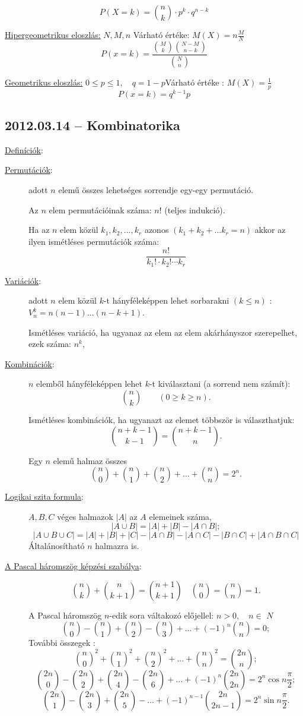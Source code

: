 \documentclass{article}
\begin{document}
$$P(X=k)=\binom{n}{k}\cdot p^k \cdot q^{n-k}$$

\noindent
\underline{Hipergeometrikus eloszlás:} $N,M,n$  \qquad Várható értéke: $M(X)=n\frac{M}{N}$
$$P(x=k)=\frac{\binom{M}{k}\binom{N-M}{n-k}}{\binom{N}{n}}$$


\noindent
\underline{Geometrikus eloszlás:} $0\leq p\leq  1,\quad q=1-p$\qquad Várható értéke : $M(X)=\frac{1}{p}$
$$P(x=k)=q^{k-1}p$$ 

\subsection*{2012.03.14 -- Kombinatorika}

\underline{Definíciók}:

\begin{description}
\item[\underline{Permutációk}:] adott $n$ elemű összes lehetséges sorrendje egy-egy permutáció.

Az $n$ elem permutációinak száma: $n!$ (teljes indukció).

Ha az $n$ elem közül $k_1,k_2,...,k_r$ azonos $(k_1+k_2+...k_r=n)$ akkor az ilyen ismétléses permutációk száma: $$\frac{n!}{k_1!\cdot k_2!\cdots k_r}$$

\item[\underline{Variációk}:] adott $n$ elem közül $k$-t hányféleképpen lehet sorbarakni $(k\leq n)$ : $V_n^k=n(n-1)...(n-k+1)$.

Ismétléses variáció, ha ugyanaz az elem az elem akárhányszor szerepelhet, ezek száma: $n^k$,

\item[\underline{Kombinációk}:] $n$ elemből hányféleképpen lehet $k$-t kiválasztani (a sorrend nem számít): $$\binom{n}{k}\qquad (0\geq k\geq n).$$

Ismétléses kombinációk, ha ugyanazt az elemet többször is választhatjuk: $$\binom{n+k-1}{k-1}=\binom{n+k-1}{n}.$$

Egy $n$ elemű halmaz összes $$\binom{n}{0}+\binom{n}{1}+\binom{n}{2}+...+\binom{n}{n}=2^n.$$

\item[\underline{Logikai szita formula}:] $A,B,C$ véges halmazok $|A|$ az $A$ elemeinek száma, $$|A\cup B|=|A|+|B|-|A\cap B|;$$
$$|A\cup B\cup C|=|A|+|B|+|C|-|A\cap B|-|A\cap C|-|B\cap C|+|A\cap B\cap C|$$
Általánosítható $n$ halmazra is.

\item[\underline{A Pascal háromszög képzési szabálya}:]
$$\binom{n}{k}+\binom{n}{k+1}=\binom{n+1}{k+1}\quad\binom{n}{0}=\binom{n}{n}=1.$$

A Pascal háromszög $n$-edik sora váltakozó előjellel: $n>0,\quad n\in$ $N$
$$\binom{n}{0}-\binom{n}{1}+\binom{n}{2}-\binom{n}{3}+...+(-1)^n\binom{n}{n}=0;$$
További összegek :
$${\binom{n}{0}}^2+{\binom{n}{1}}^2+{\binom{n}{2}}^2+...+{\binom{n}{n}}^2=\binom{2n}{n};$$
$$\binom{2n}{0}-\binom{2n}{2}+\binom{2n}{4}-\binom{2n}{6}+...+(-1)^n\binom{2n}{2n}=2^n\cos n\frac{\pi}{2};$$
$$\binom{2n}{1}-\binom{2n}{3}+\binom{2n}{5}-...+(-1)^{n-1}\binom{2n}{2n-1}=2^n\sin n\frac{\pi}{2}.$$

\end{description}
\end{document}
